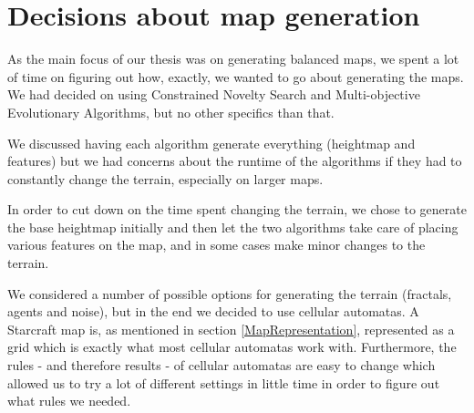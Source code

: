 \section{Decisions about map generation}
\label{DecisionsMapGeneration}

As the main focus of our thesis was on generating balanced maps, we spent a lot of time on figuring out how, exactly, we wanted to go about generating the maps. We had decided on using Constrained Novelty Search and Multi-objective Evolutionary Algorithms, but no other specifics than that.

We discussed having each algorithm generate everything (heightmap and features) but we had concerns about the runtime of the algorithms if they had to constantly change the terrain, especially on larger maps.

In order to cut down on the time spent changing the terrain, we chose to generate the base heightmap initially and then let the two algorithms take care of placing various features on the map, and in some cases make minor changes to the terrain. 

We considered a number of possible options for generating the terrain (fractals, agents and noise), but in the end we decided to use cellular automatas. A Starcraft map is, as mentioned in section \ref{MapRepresentation}, represented as a grid which is exactly what most cellular automatas work with. Furthermore, the rules - and therefore results - of cellular automatas are easy to change which allowed us to try a lot of different settings in little time in order to figure out what rules we needed.